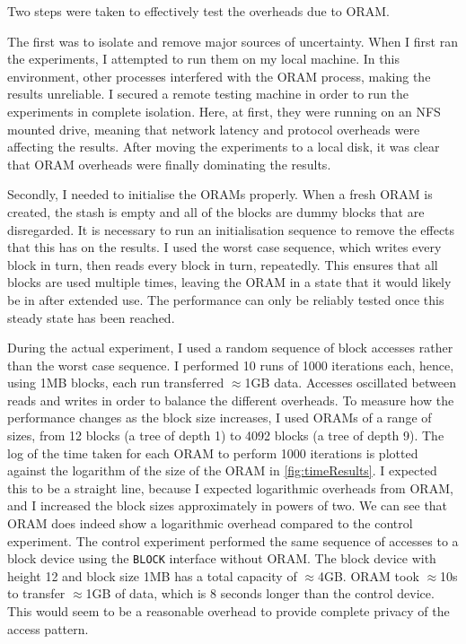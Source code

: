 \documentclass[12pt,a4paper,twoside,openright]{report}
\begin{document}
Two steps were taken to effectively test the overheads due to ORAM.

The first was to isolate and remove major sources of uncertainty. When I first ran the experiments, I attempted to run them on my local machine. In this environment, other processes interfered with the ORAM process, making the results unreliable. I secured a remote testing machine in order to run the experiments in complete isolation. Here, at first, they were running on an NFS mounted drive, meaning that network latency and protocol overheads were affecting the results. After moving the experiments to a local disk, it was clear that ORAM overheads were finally dominating the results.

Secondly, I needed to initialise the ORAMs properly. When a fresh ORAM is created, the stash is empty and all of the blocks are dummy blocks that are disregarded. It is necessary to run an initialisation sequence to remove the effects that this has on the results. I used the worst case sequence, which writes every block in turn, then reads every block in turn, repeatedly. This ensures that all blocks are used multiple times, leaving the ORAM in a state that it would likely be in after extended use. The performance can only be reliably tested once this steady state has been reached.

During the actual experiment, I used a random sequence of block accesses rather than the worst case sequence. I performed 10 runs of 1000 iterations each, hence, using 1MB blocks, each run transferred $\approx$1GB data. Accesses oscillated between reads and writes in order to balance the different overheads. To measure how the performance changes as the block size increases, I used ORAMs of a range of sizes, from 12 blocks (a tree of depth 1) to 4092 blocks (a tree of depth 9). The log of the time taken for each ORAM to perform 1000 iterations is plotted against the logarithm of the size of the ORAM in \cref{fig:timeResults}. I expected this to be a straight line, because I expected logarithmic overheads from ORAM, and I increased the block sizes approximately in powers of two. We can see that ORAM does indeed show a logarithmic overhead compared to the control experiment. The control experiment performed the same sequence of accesses to a block device using the \texttt{BLOCK} interface without ORAM. The block device with height 12 and block size 1MB has a total capacity of $\approx$4GB. ORAM took $\approx$10s to transfer $\approx$1GB of data, which is 8 seconds longer than the control device. This would seem to be a reasonable overhead to provide complete privacy of the access pattern.
\end{document}
